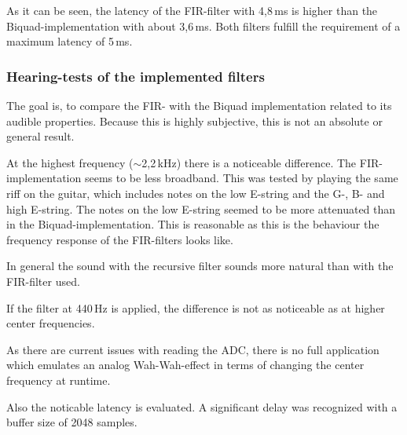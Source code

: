 As it can be seen, the latency of the \ac{FIR}-filter with 4,8\,ms is higher than the Biquad-implementation
with about 3,6\,ms. Both filters fulfill the requirement of a maximum latency of 5\,ms.

\subsubsection{Hearing-tests of the implemented filters}

The goal is, to compare the \ac{FIR}- with the Biquad implementation related to its audible properties.
Because this is highly subjective, this is not an absolute or general result.

At the highest frequency ($\sim$2,2\,kHz) there is a noticeable difference. The \ac{FIR}-implementation seems
to be less broadband. This was tested by playing the same riff on the guitar, which includes notes on the low E-string and
the G-, B- and high E-string. The notes on the low E-string seemed to be more attenuated than in the
Biquad-implementation. This is reasonable as this is the behaviour the frequency response of the \ac{FIR}-filters
looks like.

In general the sound with the recursive filter sounds more \frqq natural\flqq{} than
with the \ac{FIR}-filter used.

If the filter at 440\,Hz is applied, the difference is not as noticeable as at higher center frequencies.

As there are current issues with reading the \ac{ADC}, there is no full application which emulates
an analog Wah-Wah-effect in terms of changing the center frequency at runtime.

Also the noticable latency is evaluated. A significant delay was recognized with a buffer size of 2048 samples.
